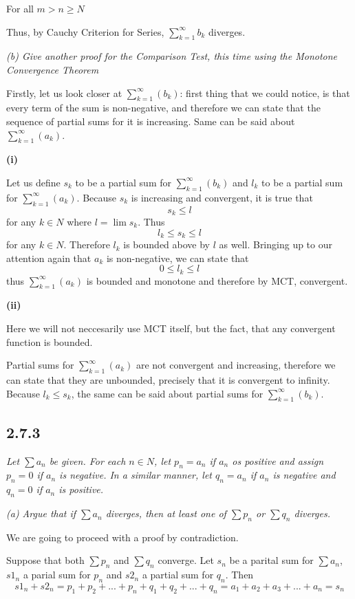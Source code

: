\documentclass[11pt,oneside,titlepage]{book}
\begin{document}
For all $m > n \geq N$ 

Thus, by Cauchy Criterion for Series,  $\sum^{\infty}_{k = 1}b_k$ diverges.

\textit{(b) Give another proof for the Comparison Test, this time using the
  Monotone Convergence Theorem}

Firstly, let us look closer at $\sum^{\infty}_{k = 1}(b_k)$: first
thing that we could
notice, is that every term of the sum is non-negative, and therefore
we can state that the sequence of partial sums for it  is increasing.
Same can be said about $\sum^{\infty}_{k = 1}(a_k)$.

\textbf{(i)}

Let us define  $s_k$ to be  a partial sum for
$\sum^{\infty}_{k = 1}(b_k)$ and $l_k$ to be a partial sum for
$\sum^{\infty}_{k = 1}(a_k)$. Because
$s_k$ is increasing and convergent, it is true that
$$s_k \leq l$$
for any $k \in N$ where $l = \lim s_k$. Thus
$$l_k \leq s_k \leq l$$
for any $k \in N$. Therefore $l_k$ is bounded above by $l$ as well.
Bringing up to our attention again that $a_k$ is non-negative, we can
state that
$$0 \leq l_k \leq l$$
thus $\sum^{\infty}_{k = 1}(a_k)$ is bounded and monotone and therefore by MCT,
convergent.

\textbf{(ii)}

Here we will not neccesarily use MCT itself, but the fact, that any convergent
function is bounded.

Partial sums for $\sum^{\infty}_{k = 1}(a_k)$ are not convergent and
increasing, therefore we can state that they are unbounded, precisely
that it is convergent to infinity. Because $l_k \leq s_k$, the same can be said
about partial sums for  $\sum^{\infty}_{k = 1}(b_k)$.

\subsection*{2.7.3}
\textit{Let $\sum a_n$ be given. For each $n \in N$, let $p_n = a_n$ if $a_n$
  os positive and assign $p_n = 0$ if $a_n$ is negative. In a similar manner,
  let $q_n = a_n$ if $a_n$ is negative and $q_n = 0$ if $a_n$ is positive. }

\textit{(a) Argue that if $\sum a_n$ diverges, then at least one of
  $\sum p_n$ or $\sum q_n$ diverges.}

We are going to proceed with a proof by contradiction.

Suppose that both $\sum p_n$ and  $\sum q_n$ converge. Let $s_n$ be
a parital sum for $\sum a_n$, $s1_n$ a parial sum for $p_n$ and $s2_n$ a
partial sum for $q_n$. Then
$$s1_n + s2_n = p_1 + p_2 + ... + p_n + q_1 + q_2 + ... + q_n =
a_1 + a_2 + a_3 + ... + a_n = s_n$$
\end{document}

